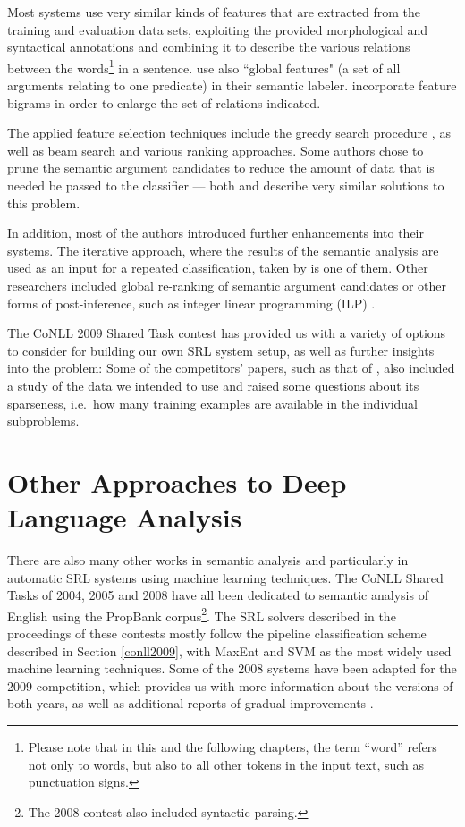 \documentclass[12pt,notitlepage]{report}
\begin{document}
Most systems use very similar kinds of features that are extracted from the training and evaluation data sets, exploiting the provided morphological and syntactical annotations and combining it to describe the various relations between the words\footnote{Please note that in this and the following chapters, the term ``word'' refers not only to words, but also to all other tokens in the input text, such as punctuation signs.} in a sentence. \citet{asahara09} use also ``global features" (a set of all arguments relating to one predicate) in their semantic labeler. \citet{nugues09} incorporate feature bigrams in order to enlarge the set of relations indicated. 

The applied feature selection techniques include the greedy search procedure \citep[among others]{nugues09,zeman09}, as well as beam search \citep[][and others]{merlo09,nugues09} and various ranking approaches. Some authors chose to prune the semantic argument candidates to reduce the amount of data that is needed be passed to the classifier --- both \citet{zhao09} and \citet{asahara09} describe very similar solutions to this problem.

In addition, most of the authors introduced further enhancements into their systems. The iterative approach, where the results of the semantic analysis are used as an input for a repeated classification, taken by \citet{chen09} is one of them. Other researchers included global re-ranking of semantic argument candidates \citep{nugues09} or other forms of post-inference, such as integer linear programming (ILP)  \citep{che09}.

The CoNLL 2009 Shared Task contest has provided us with a variety of options to consider for building our own SRL system setup, as well as further insights into the problem: Some of the competitors' papers, such as that of \citet{zeman09}, also included a study of the data we intended to use and raised some questions about its sparseness, i.e.\ how many training examples are available in the individual subproblems.

\section{Other Approaches to Deep Language Analysis}\label{related-other}

There are also many other works in semantic analysis and particularly in automatic SRL systems using machine learning techniques. The CoNLL Shared Tasks of 2004, 2005 \citep{carreras04,carreras05} and 2008 \citep{surdeanu08} have all been dedicated to semantic analysis of English using the PropBank corpus\footnote{The 2008 contest also included syntactic parsing.}. The SRL solvers described in the proceedings of these contests mostly follow the pipeline classification scheme described in Section \ref{conll2009}, with MaxEnt and SVM as the most widely used machine learning techniques. Some of the 2008 systems have been adapted for the 2009 competition, which provides us with more information about the versions of both years, as well as additional reports of gradual improvements \citep{che08,chen08}.
\end{document}
